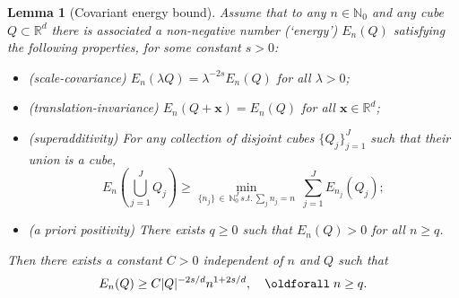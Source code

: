 \documentclass[10pt]{amsart}
\newtheorem{lemm}[theo]{Lemma}\newtheorem{prop}[theo]{Proposition}\newtheorem{coro}[theo]{Corollary}\newtheorem{conj}[theo]{Conjecture}
\theoremstyle{definition}\newtheorem{defi}[theo]{Definition}\newtheorem{rema}[theo]{Remark}\newtheorem{exam}[theo]{Example}\newtheorem{exem}[theo]{Example}\newtheorem{nota}[theo]{Notation}
\newcommand*\R {\mathbb{R}}
\newcommand\1{{\ensuremath {\mathds 1} }}
\newcommand{\bx}{\mathbf{x}}
\renewcommand*{\forall}{\mathrel{\oldforall}}
\begin{document}
\begin{lemm}[Covariant energy bound]\label{lem:energy}
Assume that to any $n\in \mathbb{N}_0$ and any cube $Q\subset \R^d$ there is associated a non-negative number (`energy') $E_n(Q)$ satisfying the following properties, for some constant $s>0$:
\begin{itemize}
\item (scale-covariance) $E_n(\lambda Q) = \lambda^{-2s} E_n(Q)$ for all $\lambda > 0$;
\item (translation-invariance) $E_n(Q+\bx) = E_n(Q)$ for all $\bx \in \R^d$;
\item (superadditivity) For any collection of disjoint cubes $\{Q_j\}_{j=1}^J$ such that their union is a cube,
\[
E_n\left(\bigcup_{j=1}^J Q_j\right) \ge \min_{\{n_j\}\,\in\,\mathbb{N}_0^J \, s.t.\, \sum_j n_j = n}\ \sum_{j=1}^J E_{n_j}(Q_j) ;
\]
\item (a priori positivity) There exists $q \ge 0$ such that $E_n(Q) > 0$ for all $n \ge q$.
\end{itemize}
Then there exists a constant $C>0$ independent of $n$ and $Q$ such that
\begin{equation}\label{eq:energy-bound}
E_n(Q) \ge C |Q|^{-2s/d} n^{1+2s/d}, \quad \forall n\ge q.
\end{equation}
\end{lemm}
\end{document}
